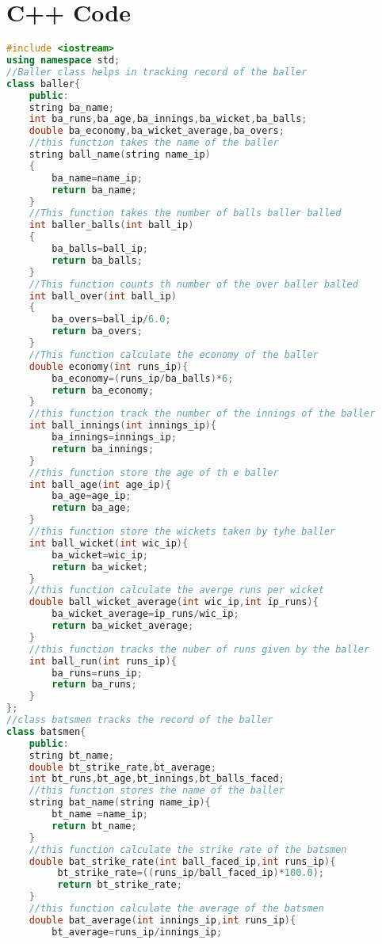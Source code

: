 \documentclass{article}
\begin{document}
\section{C++ Code}
\begin{lstlisting}[style=chstyle,language=C++]
#include <iostream>
using namespace std;
//Baller class helps in tracking record of the baller
class baller{
    public:
    string ba_name;
    int ba_runs,ba_age,ba_innings,ba_wicket,ba_balls;
    double ba_economy,ba_wicket_average,ba_overs;
    //this function takes the name of the baller
    string ball_name(string name_ip)
    {
        ba_name=name_ip;
        return ba_name;
    }
    //This function takes the number of balls baller balled
    int baller_balls(int ball_ip)
    {
        ba_balls=ball_ip;
        return ba_balls;
    }
    //This function counts th number of the over baller balled
    int ball_over(int ball_ip)
    {
        ba_overs=ball_ip/6.0;
        return ba_overs;
    }
    //This function calculate the economy of the baller
    double economy(int runs_ip){
        ba_economy=(runs_ip/ba_balls)*6;
        return ba_economy;
    }
    //this function track the number of the innings of the baller
    int ball_innings(int innings_ip){
        ba_innings=innings_ip;
        return ba_innings;
    }
    //this function store the age of th e baller
    int ball_age(int age_ip){
        ba_age=age_ip;
        return ba_age;
    }
    //this function store the wickets taken by tyhe baller
    int ball_wicket(int wic_ip){
        ba_wicket=wic_ip;
        return ba_wicket;
    }
    //this function calculate the averge runs per wicket
    double ball_wicket_average(int wic_ip,int ip_runs){
        ba_wicket_average=ip_runs/wic_ip;
        return ba_wicket_average;
    }
    //this function tracks the nuber of runs given by the baller
    int ball_run(int runs_ip){
        ba_runs=runs_ip;
        return ba_runs;
    }
};
//class batsmen tracks the record of the baller
class batsmen{
    public:
    string bt_name;
    double bt_strike_rate,bt_average;
    int bt_runs,bt_age,bt_innings,bt_balls_faced;
    //this function stores the name of the baller
    string bat_name(string name_ip){
        bt_name =name_ip;
        return bt_name;
    }
    //this function calculate the strike rate of the batsmen
    double bat_strike_rate(int ball_faced_ip,int runs_ip){
         bt_strike_rate=((runs_ip/ball_faced_ip)*100.0);
         return bt_strike_rate;
    }
    //this function calculate the average of the batsmen
    double bat_average(int innings_ip,int runs_ip){
        bt_average=runs_ip/innings_ip;

\end{lstlisting}
\end{document}
